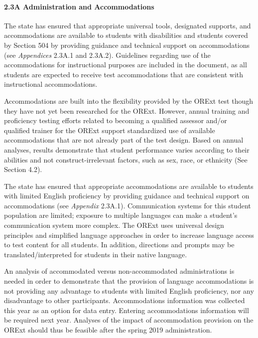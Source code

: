 \documentclass[]{article}
\let\oldparagraph\paragraph
\renewcommand{\paragraph}[1]{\oldparagraph{#1}\mbox{}}
\begin{document}
\hypertarget{a-administration-and-accommodations}{%
\paragraph{2.3A Administration and
Accommodations}\label{a-administration-and-accommodations}}

The state has ensured that appropriate universal tools, designated
supports, and accommodations are available to students with disabilities
and students covered by Section 504 by providing guidance and technical
support on accommodations (see \emph{Appendices} 2.3A.1 and 2.3A.2).
Guidelines regarding use of the accommodations for instructional
purposes are included in the document, as all students are expected to
receive test accommodations that are consistent with instructional
accommodations.

Accommodations are built into the flexibility provided by the ORExt test
though they have not yet been researched for the ORExt. However, annual
training and proficiency testing efforts related to becoming a qualified
assessor and/or qualified trainer for the ORExt support standardized use
of available accommodations that are not already part of the test
design. Based on annual analyses, results demonstrate that student
performance varies according to their abilities and not
construct-irrelevant factors, such as sex, race, or ethnicity (See
Section 4.2).

The state has ensured that appropriate accommodations are available to
students with limited English proficiency by providing guidance and
technical support on accommodations (see \emph{Appendix} 2.3A.1).
Communication systems for this student population are limited; exposure
to multiple languages can make a student's communication system more
complex. The ORExt uses universal design principles and simplified
language approaches in order to increase language access to test content
for all students. In addition, directions and prompts may be
translated/interpreted for students in their native language.

An analysis of accommodated versus non-accommodated administrations is
needed in order to demonstrate that the provision of language
accommodations is not providing any advantage to students with limited
English proficiency, nor any disadvantage to other participants.
Accommodations information was collected this year as an option for data
entry. Entering accommodations information will be required next year.
Analyses of the impact of accommodation provision on the ORExt should
thus be feasible after the spring 2019 administration.
\end{document}
